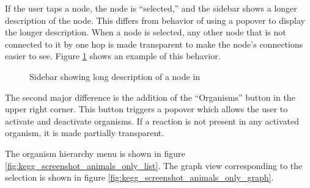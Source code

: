 If the user taps a node, the node is ``selected,'' and the sidebar shows a
longer description of the node.  This differs from \mawappp behavior of using
a popover to display the longer description. When a node is selected, any other
node that is not connected to it by one hop is made transparent to make the
node's connections easier to see.  Figure
\ref{fig:kegg_screenshot_selection_no_info} shows an example of this behavior.

\begin{figure}[hbt]
    \caption{\label{fig:kegg_screenshot_selection_no_info} Sidebar showing
    long description of a node in \keggapp}
\end{figure}

The second major difference is the addition of the ``Organisms'' button in the
upper right corner. This button triggers a popover which allows the user to
activate and deactivate organisms. If a reaction is not present in any activated
organism, it is made partially transparent.

The organism hierarchy menu is shown in figure
\ref{fig:kegg_screenshot_animals_only_list}. The graph view corresponding to the
selection is shown in figure \ref{fig:kegg_screenshot_animals_only_graph}.

